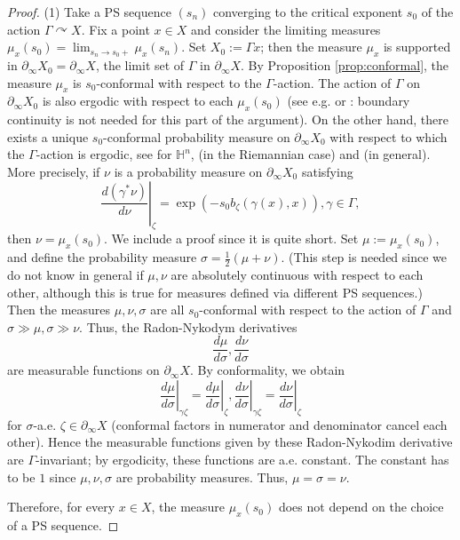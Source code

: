 \documentclass[12pt]{amsbook}%
\theoremstyle{definition}
\theoremstyle{remark}
\numberwithin{section}{chapter}
\numberwithin{subsection}{section}
\numberwithin{figure}{chapter}
\DeclareMathOperator{\acts}{\curvearrowright}
\def\bH{{\mathbb{H}}}
\def\Ga{\Gamma}
\def\ga{\gamma}
\def\al{\alpha}
\def\geo{\partial_\infty}
\begin{document}
{{\begin{proof}
(1) Take a PS sequence $(s_n)$ converging to the critical exponent $s_0$ of the action $\Ga\acts X$. Fix a point 
$x\in X$ and consider the limiting measures 
$\mu_{x}(s_0)=\lim_{s_n\to s_0+} \mu_{x}(s_n)$. Set $X_0:=\Ga x$; then the measure $\mu_x$ is supported in $\geo X_0=\geo X$, the limit set of $\Ga$ in $\geo X$.  
By Proposition \ref{prop:conformal}, the measure $\mu_x$ is $s_0$-conformal with respect to the $\Ga$-action. 
The action of $\Ga$ on $\geo X_0$ is also ergodic with respect to each $\mu_{x}(s_0)$ (see e.g. \cite{Coo93} or \cite{BF}: boundary continuity is not needed for this part of the argument). On the other hand, there exists a  unique $s_0$-conformal probability measure on $\geo X_0$ with respect to which the $\Ga$-action is ergodic, 
see \cite[Proposition 4.2.1]{nicholls} for $\bH^n$, 
\cite[Proposition 3.3.1]{Yue} (in the Riemannian case) and \cite[Proposition 15.3.6]{DSU} (in general). More precisely, if $\nu$ is a probability measure on 
$\geo X_0$ %
satisfying %
$$
\left. \frac{d(\ga^* \nu)}{d\nu}\right\vert_\zeta= \exp(-s_0  b_{\zeta}(\ga(x),x) ), \ga\in \Ga, 
$$
then $\nu=\mu_{x}(s_0)$.  We include a proof since it is quite short. Set $\mu:= \mu_{x}(s_0)$, %
 and define the probability measure $\sigma=\frac{1}{2}(\mu+\nu)$. (This step is needed since we do not know in general if $\mu, \nu$ 
 are absolutely continuous with respect to each other, although this is true for measures defined via different PS sequences.)  
 Then the measures $\mu, \nu, \sigma$ are all $s_0$-conformal with respect to the action of $\Ga$ 
 and $\sigma \gg \mu, \sigma \gg\nu$. Thus, the Radon-Nykodym derivatives 
 $$
 \frac{d\mu}{d\sigma},  \frac{d\nu}{d\sigma}
 $$ 
 are measurable functions on $\geo X$. By conformality, we obtain 
 $$
\left. \frac{d\mu}{d\sigma}\right\vert_{\ga\zeta}= \left. \frac{d\mu}{d\sigma}\right\vert_{\zeta}, \left. \frac{d\nu}{d\sigma}\right\vert_{\ga\zeta}= \left. \frac{d\nu}{d\sigma}\right\vert_{\zeta} 
$$
for $\sigma$-a.e. $\zeta\in \geo X$ (conformal factors in numerator and denominator cancel each other).   
Hence the measurable functions given by these Radon-Nykodim derivative are $\Ga$-invariant; 
by ergodicity, these functions are a.e. constant. The constant has to be $1$ since $\mu, \nu, \sigma$ 
are probability measures. Thus, $\mu=\sigma=\nu$. 

Therefore, for every $x\in X$, the measure $\mu_{x}(s_0)$ does not depend on the choice of a PS sequence. 


\end{proof}}}
\end{document}

